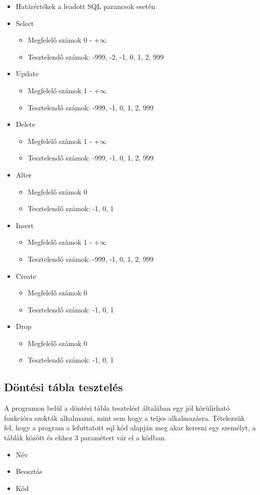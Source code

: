 \begin{itemize}
	\item Határértékek a leadott SQL parancsok esetén
	\item Select
		\begin{itemize}
			\item Megfelelő számok 0 - +$\infty$
			\item Tesztelendő számok: -999, -2, -1, 0, 1, 2, 999 
		\end{itemize}
	\item Update
		\begin{itemize}
			\item Megfelelő számok 1 - +$\infty$
			\item Tesztelendő számok: -999, -1, 0, 1, 2, 999 
		\end{itemize}
	\item Delete
		\begin{itemize}
			\item Megfelelő számok 1 - +$\infty$
			\item Tesztelendő számok: -999, -1, 0, 1, 2, 999 
		\end{itemize}
	\item Alter
		\begin{itemize}
			\item Megfelelő számok 0
			\item Tesztelendő számok: -1, 0, 1
		\end{itemize}
	\item Insert
		\begin{itemize}
			\item Megfelelő számok 1 - +$\infty$
			\item Tesztelendő számok: -999, -1, 0, 1, 2, 999 
		\end{itemize}
	\item Create
		\begin{itemize}
			\item Megfelelő számok 0
			\item Tesztelendő számok: -1, 0, 1
		\end{itemize}
	\item Drop
		\begin{itemize}
			\item Megfelelő számok 0
			\item Tesztelendő számok: -1, 0, 1
	\end{itemize}
\end{itemize}
\newpage
\subsection{Döntési tábla tesztelés} A programon belül a döntési tábla tesztelést általában egy jól körülírható funkcióra szokták alkalmazni, mint sem hogy a teljes alkalmazásra. Tételezzük fel, hogy a program a lefuttatott sql kód alapján meg akar keresni egy személyt, a táblák között és ehhez 3 paramétert vár el a kódban.\\
\begin{itemize}
	\item Név
	\item Beosztás
	\item Kód 
\end{itemize}

